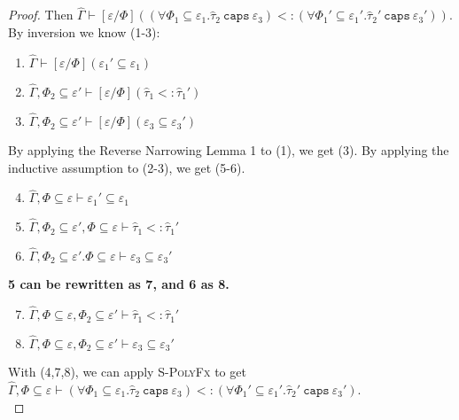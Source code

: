 \documentclass{llncs}
\newcommand{\keywadj}[1]{\mathtt{#1}}
\newcommand{\keyw}[1]{\keywadj{#1}~}
\newcommand{\kw}[1]{\keyw{ #1 }}
\begin{document}
\begin{proof}
 Then $\hat \Gamma \vdash [\varepsilon/\Phi]((\forall \Phi_1 \subseteq \varepsilon_1. \hat \tau_2~\kw{caps} \varepsilon_3) <: (\forall \Phi_1' \subseteq \varepsilon_1'. \hat \tau_2'~\kw{caps} \varepsilon_3'))$. By inversion we know (1-3):

\begin{enumerate}
	\item $\hat \Gamma \vdash [\varepsilon/\Phi](\varepsilon_1' \subseteq \varepsilon_1)$
	\item $\hat \Gamma, \Phi_2 \subseteq \varepsilon' \vdash [\varepsilon/\Phi](\hat \tau_1 <: \hat \tau_1')$
	\item $\hat \Gamma, \Phi_2 \subseteq \varepsilon' \vdash [\varepsilon/\Phi](\varepsilon_3 \subseteq \varepsilon_3')$
\end{enumerate}

\noindent
By applying the Reverse Narrowing Lemma 1 to (1), we get (3). By applying the inductive assumption to (2-3), we get (5-6).

\begin{enumerate}
	\setcounter{enumi}{3}
	\item $\hat \Gamma, \Phi \subseteq \varepsilon \vdash \varepsilon_1' \subseteq \varepsilon_1$
	\item $\hat \Gamma, \Phi_2 \subseteq \varepsilon', \Phi \subseteq \varepsilon \vdash \hat \tau_1 <: \hat \tau_1'$
	\item $\hat \Gamma, \Phi_2 \subseteq \varepsilon'. \Phi \subseteq \varepsilon \vdash \varepsilon_3 \subseteq \varepsilon_3'$
\end{enumerate}

\noindent
\textbf{5 can be rewritten as 7, and 6 as 8.}

\begin{enumerate}
	\setcounter{enumi}{6}
	\item $\hat \Gamma, \Phi \subseteq \varepsilon, \Phi_2 \subseteq \varepsilon' \vdash \hat \tau_1 <: \hat \tau_1'$
	\item $\hat \Gamma, \Phi \subseteq \varepsilon, \Phi_2 \subseteq \varepsilon' \vdash \varepsilon_3 \subseteq \varepsilon_3'$
\end{enumerate}

\noindent
With (4,7,8), we can apply \textsc{S-PolyFx} to get $\hat \Gamma, \Phi \subseteq \varepsilon \vdash (\forall \Phi_1 \subseteq \varepsilon_1. \hat \tau_2~\kw{caps} \varepsilon_3) <: (\forall \Phi_1' \subseteq \varepsilon_1'. \hat \tau_2'~\kw{caps} \varepsilon_3')$.\\

\end{proof}
\end{document}

